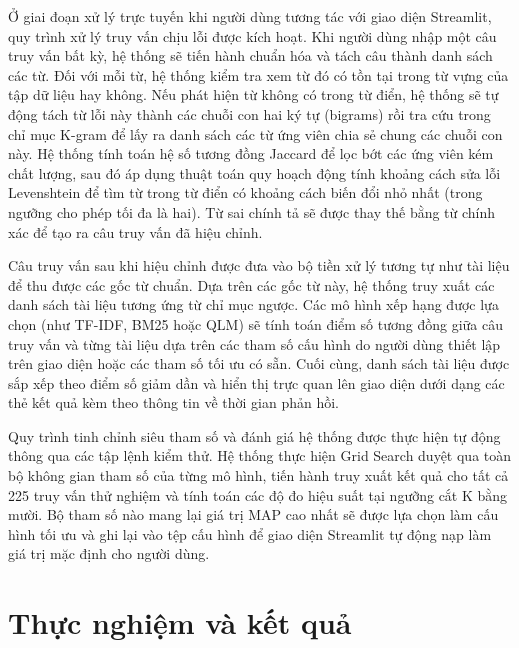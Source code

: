 \documentclass[12pt,a4paper,twoside]{article}
\begin{document}
Ở giai đoạn xử lý trực tuyến khi người dùng tương tác với giao diện Streamlit, quy trình xử lý truy vấn chịu lỗi được kích hoạt. Khi người dùng nhập một câu truy vấn bất kỳ, hệ thống sẽ tiến hành chuẩn hóa và tách câu thành danh sách các từ. Đối với mỗi từ, hệ thống kiểm tra xem từ đó có tồn tại trong từ vựng của tập dữ liệu hay không. Nếu phát hiện từ không có trong từ điển, hệ thống sẽ tự động tách từ lỗi này thành các chuỗi con hai ký tự (bigrams) rồi tra cứu trong chỉ mục K-gram để lấy ra danh sách các từ ứng viên chia sẻ chung các chuỗi con này. Hệ thống tính toán hệ số tương đồng Jaccard để lọc bớt các ứng viên kém chất lượng, sau đó áp dụng thuật toán quy hoạch động tính khoảng cách sửa lỗi Levenshtein để tìm từ trong từ điển có khoảng cách biến đổi nhỏ nhất (trong ngưỡng cho phép tối đa là hai). Từ sai chính tả sẽ được thay thế bằng từ chính xác để tạo ra câu truy vấn đã hiệu chỉnh.

Câu truy vấn sau khi hiệu chỉnh được đưa vào bộ tiền xử lý tương tự như tài liệu để thu được các gốc từ chuẩn. Dựa trên các gốc từ này, hệ thống truy xuất các danh sách tài liệu tương ứng từ chỉ mục ngược. Các mô hình xếp hạng được lựa chọn (như TF-IDF, BM25 hoặc QLM) sẽ tính toán điểm số tương đồng giữa câu truy vấn và từng tài liệu dựa trên các tham số cấu hình do người dùng thiết lập trên giao diện hoặc các tham số tối ưu có sẵn. Cuối cùng, danh sách tài liệu được sắp xếp theo điểm số giảm dần và hiển thị trực quan lên giao diện dưới dạng các thẻ kết quả kèm theo thông tin về thời gian phản hồi.

Quy trình tinh chỉnh siêu tham số và đánh giá hệ thống được thực hiện tự động thông qua các tập lệnh kiểm thử. Hệ thống thực hiện Grid Search duyệt qua toàn bộ không gian tham số của từng mô hình, tiến hành truy xuất kết quả cho tất cả 225 truy vấn thử nghiệm và tính toán các độ đo hiệu suất tại ngưỡng cắt K bằng mười. Bộ tham số nào mang lại giá trị MAP cao nhất sẽ được lựa chọn làm cấu hình tối ưu và ghi lại vào tệp cấu hình để giao diện Streamlit tự động nạp làm giá trị mặc định cho người dùng.

\section{Thực nghiệm và kết quả}

\end{document}
